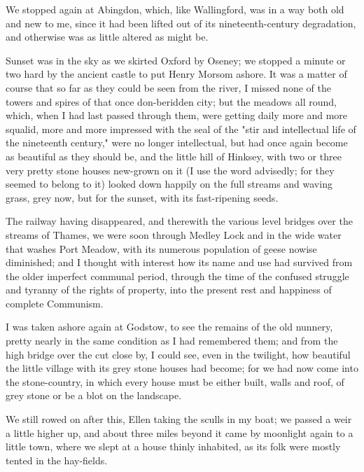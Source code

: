 We stopped again at Abingdon, which, like Wallingford, was in a way both
old and new to me, since it had been lifted out of its
nineteenth-century degradation, and otherwise was as little altered as
might be.

Sunset was in the sky as we skirted Oxford by Oseney; we stopped a
minute or two hard by the ancient castle to put Henry Morsom ashore. It
was a matter of course that so far as they could be seen from the river,
I missed none of the towers and spires of that once don-beridden city;
but the meadows all round, which, when I had last passed through them,
were getting daily more and more squalid, more and more impressed with
the seal of the "stir and intellectual life of the nineteenth century,"
were no longer intellectual, but had once again become as beautiful as
they should be, and the little hill of Hinksey, with two or three very
pretty stone houses new-grown on it (I use the word advisedly; for they
seemed to belong to it) looked down happily on the full streams and
waving grass, grey now, but for the sunset, with its fast-ripening
seeds.

The railway having disappeared, and therewith the various level bridges
over the streams of Thames, we were soon through Medley Lock and in the
wide water that washes Port Meadow, with its numerous population of
geese nowise diminished; and I thought with interest how its name and
use had survived from the older imperfect communal period, through the
time of the confused struggle and tyranny of the rights of property,
into the present rest and happiness of complete Communism.

I was taken ashore again at Godstow, to see the remains of the old
nunnery, pretty nearly in the same condition as I had remembered them;
and from the high bridge over the cut close by, I could see, even in the
twilight, how beautiful the little village with its grey stone houses
had become; for we had now come into the stone-country, in which every
house must be either built, walls and roof, of grey stone or be a blot
on the landscape.

We still rowed on after this, Ellen taking the sculls in my boat; we
passed a weir a little higher up, and about three miles beyond it came
by moonlight again to a little town, where we slept at a house thinly
inhabited, as its folk were mostly tented in the hay-fields.
